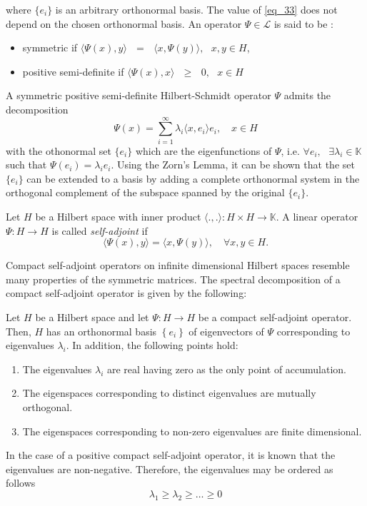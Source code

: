 where $\{e_i\}$ is an arbitrary orthonormal basis. The value of \eqref{eq_33} does not depend on the chosen orthonormal basis. An operator $\Psi \in \mathcal{L}$ is said to be :
\begin{itemize}
\item symmetric if $\langle \Psi(x),y \rangle \text{ }=\text{ }\langle x,\Psi(y)\rangle, \text{ } x,y \in H$,
\item positive semi-definite if $\langle \Psi(x),x\rangle \text{ }\geq\text{ }0, \text{ } x \in H$
\end{itemize}
A symmetric positive semi-definite Hilbert-Schmidt operator $\Psi$ admits the decomposition
\begin{equation}
\Psi(x) = \sum_{i=1}^{\infty} \lambda_i \langle x,e_i\rangle e_i, \quad x \in H
\end{equation}
with the othonormal set $\{e_i\}$ which are the eigenfunctions of $\Psi$, i.e. $\forall e_i,\text{ } \exists \lambda_i \in \mathbb{K}$ such that $\Psi(e_i) = \lambda_i e_i$. Using the Zorn's Lemma, it can be shown that the set $\{e_i\}$ can be extended to a basis by adding a complete orthonormal system in the orthogonal complement of the subspace spanned by the original $\{e_i\}$.
\begin{definition}
Let $H$ be a Hilbert space with inner product $\langle.,.\rangle: H \times H \rightarrow \mathbb{K}$. A linear operator $\Psi: H \rightarrow H$ is called \textit{self-adjoint} if
\begin{equation}
\langle \Psi(x), y \rangle = \langle x, \Psi(y) \rangle, \quad \forall x,y \in H.
\end{equation}
\end{definition}
Compact self-adjoint operators on infinite dimensional Hilbert spaces resemble many properties of the symmetric matrices. The spectral decomposition of a compact self-adjoint operator is given by the following:
\begin{theorem}
Let $H$ be a Hilbert space and let $\Psi: H \rightarrow H$ be a compact self-adjoint operator. Then, $H$ has an orthonormal basis $\left\{e_i\right\}$ of eigenvectors of $\Psi$ corresponding to eigenvalues $\lambda_i$. In addition, the following points hold:
\begin{enumerate}
\item The eigenvalues $\lambda_i$ are real having zero as the only point of accumulation.
\item The eigenspaces corresponding to distinct eigenvalues are mutually orthogonal.
\item The eigenspaces corresponding to non-zero eigenvalues are finite dimensional.
\end{enumerate}
In the case of a positive compact self-adjoint operator, it is known that the eigenvalues are non-negative. Therefore, the eigenvalues may be ordered as follows
\begin{equation*}
\lambda_1 \geq \lambda_2 \geq \dots \geq 0
\end{equation*}

\end{theorem}
\clearpage

